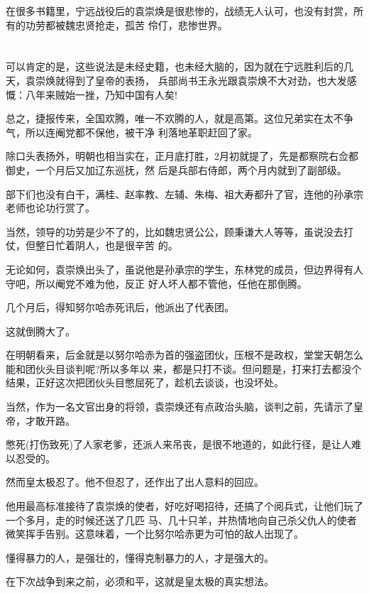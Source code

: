 \documentclass[11pt,a4paper,onecolumn]{article}
\begin{document}
在很多书籍里，宁远战役后的袁崇焕是很悲惨的，战绩无人认可，也没有封赏，所有的功劳都被魏忠贤抢走，孤苦
伶仃，悲惨世界。

\section[\thesection]{}

可以肯定的是，这些说法是未经史籍，也未经大脑的，因为就在宁远胜利后的几天，袁崇焕就得到了皇帝的表扬，
兵部尚书王永光跟袁崇焕不大对劲，也大发感慨：八年来贼始一挫，乃知中国有人矣!

总之，捷报传来，全国欢腾，唯一不欢腾的人，就是高第。这位兄弟实在太不争气，所以连阉党都不保他，被干净
利落地革职赶回了家。

除口头表扬外，明朝也相当实在，正月底打胜，2月初就提了，先是都察院右佥都御史，一个月后又加辽东巡抚，然
后是兵部右侍郎，两个月内就到了副部级。

部下们也没有白干，满桂、赵率教、左辅、朱梅、祖大寿都升了官，连他的孙承宗老师也论功行赏了。

当然，领导的功劳是少不了的，比如魏忠贤公公，顾秉谦大人等等，虽说没去打仗，但整日忙着阴人，也是很辛苦
的。

无论如何，袁崇焕出头了，虽说他是孙承宗的学生，东林党的成员，但边界得有人守吧，所以阉党不难为他，反正
好人坏人都不管他，任他在那倒腾。

几个月后，得知努尔哈赤死讯后，他派出了代表团。

这就倒腾大了。

在明朝看来，后金就是以努尔哈赤为首的强盗团伙，压根不是政权，堂堂天朝怎么能和团伙头目谈判呢?所以多年以
来，都是只打不谈。但问题是，打来打去都没个结果，正好这次把团伙头目憋屈死了，趁机去谈谈，也没坏处。

当然，作为一名文官出身的将领，袁崇焕还有点政治头脑，谈判之前，先请示了皇帝，才敢开路。

憋死(打伤致死)了人家老爹，还派人来吊丧，是很不地道的，如此行径，是让人难以忍受的。

然而皇太极忍了。他不但忍了，还作出了出人意料的回应。

他用最高标准接待了袁崇焕的使者，好吃好喝招待，还搞了个阅兵式，让他们玩了一个多月，走的时候还送了几匹
马、几十只羊，并热情地向自己杀父仇人的使者微笑挥手告别。这意味着，一个比努尔哈赤更为可怕的敌人出现了。

懂得暴力的人，是强壮的，懂得克制暴力的人，才是强大的。

在下次战争到来之前，必须和平，这就是皇太极的真实想法。

\section[\thesection]{}
\end{document}
